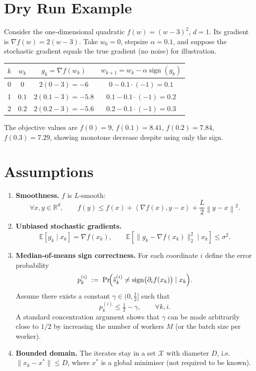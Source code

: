 \documentclass{article}
\newcommand{\sign}{\operatorname{sign}}
\newcommand{\E}{\mathbb{E}}
\newcommand{\R}{\mathbb{R}}
\newcommand{\norm}[1]{\left\|#1\right\|}
\newcommand{\ip}[2]{\left\langle #1,#2\right\rangle}
\begin{document}
\section*{Dry Run Example}
Consider the one‑dimensional quadratic $f(w)=(w-3)^2$, $d=1$.  
Its gradient is $\nabla f(w)=2(w-3)$.  
Take $w_0=0$, stepsize $\alpha=0.1$, and suppose the stochastic gradient equals the true gradient (no noise) for illustration.

\begin{center}
\begin{tabular}{c|c|c|c}
$k$ & $w_k$ & $g_k=\nabla f(w_k)$ & $w_{k+1}=w_k-\alpha\sign(g_k)$\\ \hline
0 & $0$ & $2(0-3)=-6$ & $0-0.1\cdot(-1)=0.1$\\
1 & $0.1$ & $2(0.1-3)=-5.8$ & $0.1-0.1\cdot(-1)=0.2$\\
2 & $0.2$ & $2(0.2-3)=-5.6$ & $0.2-0.1\cdot(-1)=0.3$\\
\end{tabular}
\end{center}
The objective values are $f(0)=9$, $f(0.1)=8.41$, $f(0.2)=7.84$, $f(0.3)=7.29$, showing monotone decrease despite using only the sign.

\newpage

\section*{Assumptions}
\begin{enumerate}[label=(A\arabic*)]
\item \textbf{Smoothness.} $f$ is $L$‑smooth:
\[
\forall x,y\in\R^{d},\qquad 
f(y)\le f(x)+\ip{\nabla f(x)}{y-x}+\frac{L}{2}\norm{y-x}^{2}.
\tag{A1}
\]
\item \textbf{Unbiased stochastic gradients.}
\[
\E\!\left[g_k\mid x_k\right]=\nabla f(x_k),\qquad 
\E\!\left[\|g_k-\nabla f(x_k)\|_{2}^{2}\mid x_k\right]\le\sigma^{2}.
\tag{A2}
\]
\item \textbf{Median‑of‑means sign correctness.}  
For each coordinate $i$ define the error probability
\[
p_{k}^{(i)}\;:=\; \Pr\!\Bigl(\tilde{s}_k^{(i)}\neq \sign\bigl(\partial_i f(x_k)\bigr)\mid x_k\Bigr).
\]
Assume there exists a constant $\gamma\in(0,\tfrac12]$ such that
\[
p_{k}^{(i)}\le \tfrac12-\gamma,\qquad\forall k,i.
\tag{A3}
\]
A standard concentration argument shows that $\gamma$ can be made arbitrarily close to $1/2$ by increasing the number of workers $M$ (or the batch size per worker).
\item \textbf{Bounded domain.} The iterates stay in a set $\mathcal{X}$ with diameter $D$, i.e. $\|x_k-x^*\|\le D$, where $x^*$ is a global minimiser (not required to be known).
\end{enumerate}
\end{document}
